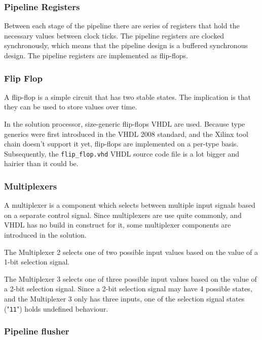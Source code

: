 \subsubsection{Pipeline Registers}

Between each stage of the pipeline there are series of registers that hold the necessary values between clock ticks.
The pipeline registers are clocked synchronously, which means that the pipeline design is a buffered synchronous design.
The pipeline registers are implemented as flip-flops.


\subsubsection{Flip Flop}

A flip-flop is a simple circuit that has two stable states.
The implication is that they can be used to store values over time.

In the solution processor, size-generic flip-flops VHDL are used.
Because type generics were first introduced in the VHDL 2008 standard\cite{vhdl2008}, and the Xilinx tool chain doesn't support it yet, flip-flops are implemented on a per-type basis.
Subsequently, the \texttt{flip\_flop.vhd} VHDL source code file is a lot bigger and hairier than it could be.

\subsubsection{Multiplexers}

A multiplexer is a component which selects between multiple input signals based on a separate control signal.
Since multiplexers are use quite commonly, and VHDL has no build in construct for it, some multiplexer components are introduced in the solution.


The Multiplexer 2 selects one of two possible input values based on the value of a 1-bit selection signal.


The Multiplexer 3 selects one of three possible input values based on the value of a 2-bit selection signal.
Since a 2-bit selection signal may have 4 possible states, and the Multiplexer 3 only has three inputs, one of the selection signal states ("\texttt{11}") holds undefined behaviour.

\subsubsection{Pipeline flusher}

